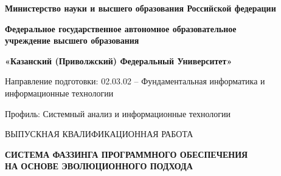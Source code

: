\begin{titlepage}
	\begin{singlespace}
	\setlength{\abovedisplayskip}{0pt}
	\setlength{\belowdisplayskip}{0pt}
	
	\begin{center}
		\fontsize{14}{14}\bf
		Министерство науки и высшего образования Российской федерации
	\end{center}
	\vspace{-1cm}
	\begin{center}
		\fontsize{14}{14}\bf
		Федеральное государственное автономное образовательное\\ учреждение высшего образования
	\end{center}
	\vspace{-1cm}
	\begin{center}
		\fontsize{12}{12}\bf «Казанский (Приволжский) Федеральный Университет»
	\end{center}
	\vspace{-1cm}
	\begin{center}
	\end{center}
	\vspace{-1cm}
	\begin{center}
	\end{center}
	\vspace{1.5cm}
	\begin{center}
		\fontsize{14}{14} Направление подготовки: 02.03.02 -- Фундаментальная информатика и информационные технологии
	\end{center}
	\vspace{-1cm}
	\begin{center}
		\fontsize{14}{14} Профиль: Системный анализ и информационные технологии
	\end{center}

	\begin{center}
		\MakeUppercase{выпускная квалификационная работа}
		\vspace{0.4cm}
		
		\bf \MakeUppercase{Система фаззинга программного обеспечения \\ на основе эволюционного подхода}
	\end{center}

	\end{singlespace}

	\vspace{5cm}


\end{titlepage}
